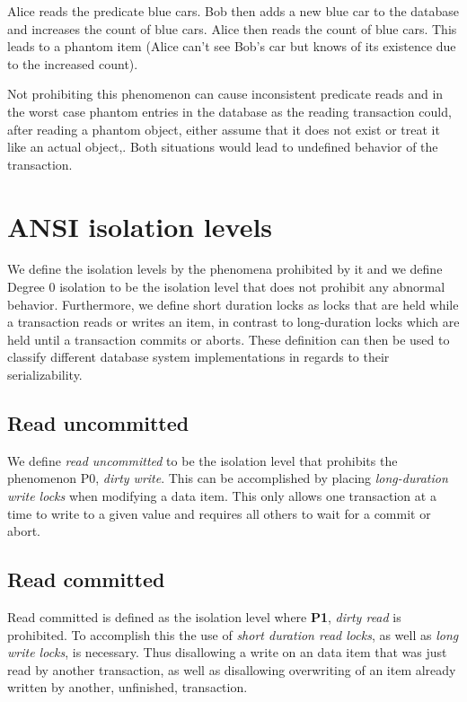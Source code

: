 \documentclass[sigconf, review=false]{acmart}
\begin{document}
\begin{example}
    Alice reads the predicate blue cars. Bob then adds a new blue car to the database and increases
    the count of blue cars. Alice then reads the count of blue cars. This leads to a phantom item
    (Alice can’t see Bob's car but knows of its existence due to the increased count).
\end{example}
Not prohibiting this phenomenon can cause inconsistent predicate reads and in the worst case phantom entries in the
database as the reading transaction could, after reading a phantom object, either assume that it does not exist or treat it like an actual
object,. Both situations would lead to undefined behavior of the transaction.

\section{ANSI isolation levels}
We define the isolation levels by the phenomena prohibited by it and we define
Degree 0 isolation to be the isolation level that does not prohibit any abnormal
behavior. Furthermore, we define short duration locks as locks that are held
while a transaction reads or writes an item, in contrast to long-duration locks which are
held until a transaction commits or aborts.
These definition can then be used to classify different database system implementations in
regards to their serializability.

\subsection{Read uncommitted}
We define \emph{read uncommitted} to be the isolation level that prohibits the phenomenon
P0, \emph{dirty write}. This can be accomplished by placing \emph{long-duration write locks} when modifying a data item.
This only allows one transaction at a time to write to a given value and requires all others to wait for a commit or abort.

\subsection{Read committed}
Read committed is defined as the isolation level where \textbf{P1}, \emph{dirty read} is prohibited.
To accomplish this the use of \emph{short duration read locks}, as well as \emph{long write locks}, is
necessary. Thus disallowing a write on an data item that was just read by another transaction, as
well as disallowing overwriting of an item already written by another, unfinished, transaction.
\end{document}
